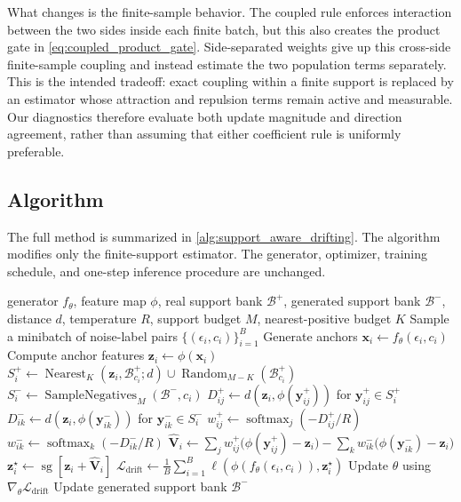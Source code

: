 \documentclass{article}
\let\REQUIRE\Require
\let\STATE\State
\let\FOR\For
\let\ENDFOR\EndFor
\newcommand{\V}{\mathbf{V}}
\newcommand{\x}{\mathbf{x}}
\newcommand{\yp}{\mathbf{y}^{+}}
\newcommand{\yn}{\mathbf{y}^{-}}
\newcommand{\z}{\mathbf{z}}
\newcommand{\sg}{\operatorname{sg}}
\newcommand{\softmax}{\operatorname{softmax}}
\begin{document}
What changes is the finite-sample behavior.
The coupled rule enforces interaction between the two sides inside each finite batch, but this also creates the product gate in \cref{eq:coupled_product_gate}.
Side-separated weights give up this cross-side finite-sample coupling and instead estimate the two population terms separately.
This is the intended tradeoff: exact coupling within a finite support is replaced by an estimator whose attraction and repulsion terms remain active and measurable.
Our diagnostics therefore evaluate both update magnitude and direction agreement, rather than assuming that either coefficient rule is uniformly preferable.

\subsection{Algorithm}
\label{subsec:algorithm}

The full method is summarized in \cref{alg:support_aware_drifting}.
The algorithm modifies only the finite-support estimator.
The generator, optimizer, training schedule, and one-step inference procedure are unchanged.

\begin{algorithm}[h!]
\caption{Support-aware drifting update}
\label{alg:support_aware_drifting}
\begin{algorithmic}[1]
\REQUIRE generator $f_\theta$, feature map $\phi$, real support bank $\mathcal{B}^{+}$, generated support bank $\mathcal{B}^{-}$, distance $d$, temperature $R$, support budget $M$, nearest-positive budget $K$
\STATE Sample a minibatch of noise-label pairs $\{(\epsilon_i,c_i)\}_{i=1}^{B}$
\STATE Generate anchors $\x_i \gets f_\theta(\epsilon_i,c_i)$
\STATE Compute anchor features $\z_i \gets \phi(\x_i)$
\FOR{$i=1,\ldots,B$}
    \STATE $S_i^{+} \gets \operatorname{Nearest}_{K}(\z_i,\mathcal{B}^{+}_{c_i};d) \cup \operatorname{Random}_{M-K}(\mathcal{B}^{+}_{c_i})$
    \STATE $S_i^{-} \gets \operatorname{SampleNegatives}_{M}(\mathcal{B}^{-},c_i)$
    \STATE $D_{ij}^{+} \gets d(\z_i,\phi(\yp_{ij}))$ for $\yp_{ij}\in S_i^{+}$
    \STATE $D_{ik}^{-} \gets d(\z_i,\phi(\yn_{ik}))$ for $\yn_{ik}\in S_i^{-}$
    \STATE $w_{ij}^{+} \gets \softmax_j(-D_{ij}^{+}/R)$
    \STATE $w_{ik}^{-} \gets \softmax_k(-D_{ik}^{-}/R)$
    \STATE $\widehat{\V}_i \gets
    \sum_j w_{ij}^{+}\bigl(\phi(\yp_{ij})-\z_i\bigr)
    -
    \sum_k w_{ik}^{-}\bigl(\phi(\yn_{ik})-\z_i\bigr)$
    \STATE $\z_i^{\star} \gets \sg[\z_i+\widehat{\V}_i]$
\ENDFOR
\STATE $\mathcal{L}_{\mathrm{drift}} \gets \frac{1}{B}\sum_{i=1}^{B}\ell(\phi(f_\theta(\epsilon_i,c_i)),\z_i^{\star})$
\STATE Update $\theta$ using $\nabla_\theta \mathcal{L}_{\mathrm{drift}}$
\STATE Update generated support bank $\mathcal{B}^{-}$
\end{algorithmic}
\end{algorithm}
\end{document}
